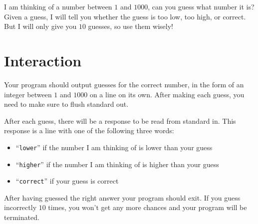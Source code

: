 
I am thinking of a number between $1$ and $1000$, can you guess what
number it is?  Given a guess, I will tell you whether the guess is too
low, too high, or correct.  But I will only give you $10$ guesses, so
use them wisely!

\section*{Interaction}

Your program should output guesses for the correct number, in the form
of an integer between $1$ and $1000$ on a line on its own.  After
making each guess, you need to make sure to flush standard out.

After each guess, there will be a response to be read from standard
in.  This response is a line with one of the following three words:
\begin{itemize}
\item ``\texttt{lower}'' if the number I am thinking of is lower than your guess
\item ``\texttt{higher}'' if the number I am thinking of is higher than your guess
\item ``\texttt{correct}'' if your guess is correct
\end{itemize}
After having guessed the right answer your program should exit.  If
you guess incorrectly $10$ times, you won't get any more chances and
your program will be terminated.
